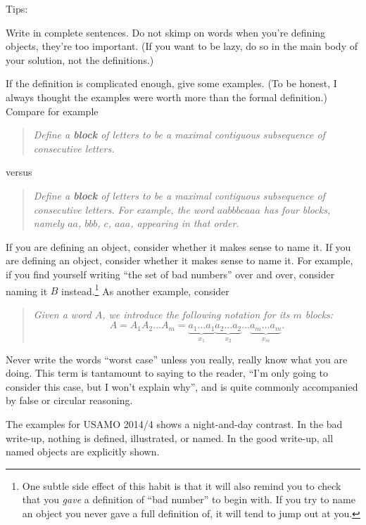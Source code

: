 \documentclass[11pt]{scrartcl}
\begin{document}
Tips:
\begin{itemize}
  \ii \alert{Write in complete sentences}.
  Do not skimp on words when you're defining objects, they're too important.
  (If you want to be lazy, do so in the main body of your solution, not the definitions.)

  \ii If the definition is complicated enough, \alert{give some examples}.
  (To be honest, I always thought the examples were worth more than the formal definition.)
  Compare for example
  \begin{quote}
  \slshape
  Define a \textbf{block} of letters to be a maximal
  contiguous subsequence of consecutive letters.
  \end{quote}
  versus
  \begin{quote}
  \slshape
  Define a \textbf{block} of letters to be a maximal
  contiguous subsequence of consecutive letters.
  For example, the word $aabbbcaaa$ has four blocks,
  namely $aa$, $bbb$, $c$, $aaa$, appearing in that order.
  \end{quote}

  \ii If you are defining an object,
  \alert{consider whether it makes sense to name it}.
  \ii If you are defining an object,
  \alert{consider whether it makes sense to name it}.
  For example, if you find yourself writing ``the set of bad numbers'' over and over,
  consider naming it $B$ instead.\footnote{One subtle
    side effect of this habit is that it will also remind you to check
    that you \emph{gave} a definition of ``bad number'' to begin with.
    If you try to name an object you never gave a full definition of,
    it will tend to jump out at you.}
  As another example, consider
  \begin{quote}
  \slshape
  Given a word $A$, we introduce the following notation for its $m$ blocks:
  \[ A =
    A_1 A_2 \dots A_m
    = \underbrace{a_1 \dots a_1}_{x_1}
    \underbrace{a_2 \dots a_2}_{x_2}
    \dots
    \underbrace{a_m \dots a_m}_{x_m}.
  \]
  \end{quote}

  \ii \alert{Never write the words ``worst case''} unless you really,
  really know what you are doing.
  This term is tantamount to saying to the reader,
  ``I'm only going to consider this case, but I won't explain why'',
  and is quite commonly accompanied by false or circular reasoning.
\end{itemize}
The examples for USAMO 2014/4 shows a night-and-day contrast.
In the bad write-up, nothing is defined, illustrated, or named.
In the good write-up, all named objects are explicitly shown.
\end{document}
